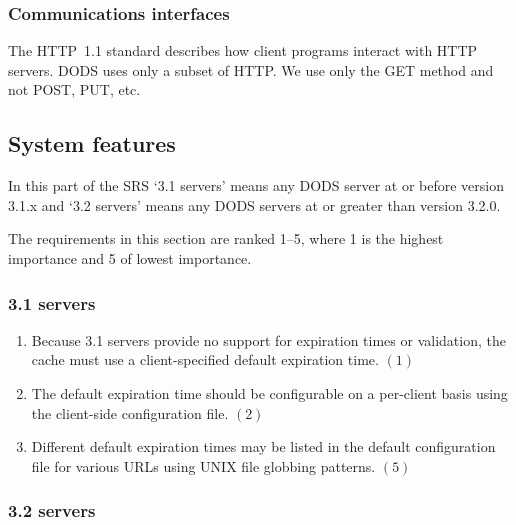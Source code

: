 \documentclass{article}
\begin{document}
\subsubsection{Communications interfaces}
The HTTP~1.1 standard describes how client programs interact with HTTP
servers. DODS uses only a subset of HTTP. We use only the GET method and not
POST, PUT, etc.

\subsection{System features}
In this part of the \ac{SRS} `3.1 servers' means any DODS server at or before
version 3.1.x and `3.2 servers' means any DODS servers at or greater than
version 3.2.0.

The requirements in this section are ranked 1--5, where 1 is the highest
importance and 5 of lowest importance.

\subsubsection{3.1 servers}
\begin{enumerate}
\item Because 3.1 servers provide no support for expiration times or
  validation, the cache must use a client-specified default expiration time.
  $(1)$
\item The default expiration time should be configurable on a per-client
  basis using the client-side configuration file. $(2)$
\item Different default expiration times may be listed in the default
  configuration file for various URLs using UNIX file globbing patterns. $(5)$
\end{enumerate}

\subsubsection{3.2 servers}
\end{document}

